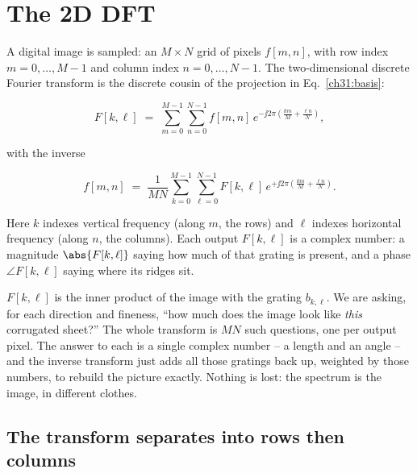 \section{The 2D DFT}
\label{ch31:2d-dft}

A digital image is sampled: an $M\times N$ grid of pixels $f[m,n]$, with row index
$m=0,\dots,M-1$ and column index $n=0,\dots,N-1$. The two-dimensional discrete
Fourier transform is the discrete cousin of the projection in
Eq.~\eqref{ch31:basis}:

\begin{equation}
F[k,\ell] \;=\; \sum_{m=0}^{M-1}\sum_{n=0}^{N-1}
f[m,n]\, e^{-\jj 2\pi\left(\frac{k m}{M} + \frac{\ell n}{N}\right)},
\label{ch31:dft2d}
\end{equation}

with the inverse

\begin{equation}
f[m,n] \;=\; \frac{1}{MN}\sum_{k=0}^{M-1}\sum_{\ell=0}^{N-1}
F[k,\ell]\, e^{+\jj 2\pi\left(\frac{k m}{M} + \frac{\ell n}{N}\right)}.
\label{ch31:idft2d}
\end{equation}

Here $k$ indexes vertical frequency (along $m$, the rows) and $\ell$ indexes
horizontal frequency (along $n$, the columns). Each output $F[k,\ell]$ is a complex
number: a magnitude $\abs{F[k,\ell]}$ saying how much of that grating is present,
and a phase $\angle F[k,\ell]$ saying where its ridges sit.

\begin{happeningbox}
$F[k,\ell]$ is the inner product of the image with the grating $b_{k,\ell}$. We are
asking, for each direction and fineness, ``how much does the image look like
\emph{this} corrugated sheet?'' The whole transform is $MN$ such questions, one per
output pixel. The answer to each is a single complex number -- a length and an
angle -- and the inverse transform just adds all those gratings back up, weighted by
those numbers, to rebuild the picture exactly. Nothing is lost: the spectrum is
the image, in different clothes.
\end{happeningbox}

\subsection{The transform separates into rows then columns}
\label{ch31:separable-dft}

